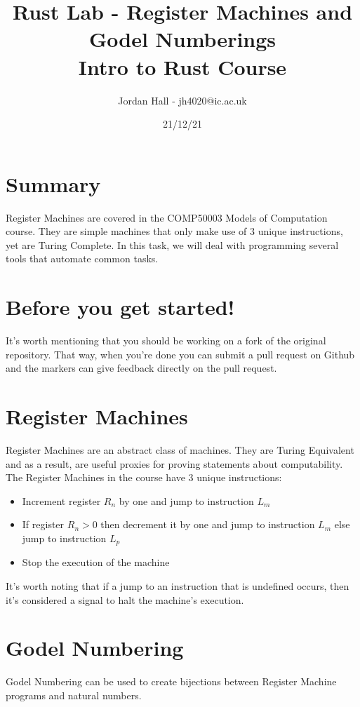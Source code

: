 \documentclass{report}
\title{%
    Rust Lab - Register Machines and Godel Numberings \\
    \large Intro to Rust Course
    }
\author{Jordan Hall - jh4020@ic.ac.uk}
\date{21/12/21}
\begin{document}
\maketitle

\section*{Summary}
Register Machines are covered in the COMP50003 Models of Computation course. 
They are simple machines that only make use of 3 unique instructions, yet are 
Turing Complete. In this task, we will deal with programming several tools that 
automate common tasks.

\section*{Before you get started!}
It's worth mentioning that you should be working on a fork of the original repository.
That way, when you're done you can submit a pull request on Github and the markers can
give feedback directly on the pull request.

\section*{Register Machines}
Register Machines are an abstract class of machines. They are Turing Equivalent 
and as a result, are useful proxies for proving statements about computability.\\
The Register Machines in the course have 3 unique instructions:
\begin{itemize}
    \item { Increment register $R_n$ by one and jump to 
    instruction $L_m$}
    \item { If register $R_n>0$ then decrement it by one 
    and jump to instruction $L_m$ else jump to instruction $L_p$}
    \item { Stop the execution of the machine}
\end{itemize}
It’s worth noting that if a jump to an instruction that is undefined occurs, 
then it’s considered a signal to halt the machine’s execution.

\section*{Godel Numbering}
Godel Numbering can be used to create bijections between Register Machine programs 
and natural numbers.
\end{document}
